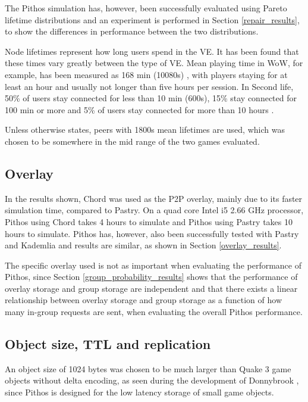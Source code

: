 The Pithos simulation has, however, been successfully evaluated using Pareto lifetime distributions and an experiment is performed in Section \ref{repair_results}, to show the differences in performance between the two distributions.

Node lifetimes represent how long users spend in the VE. It has been found that these times vary greatly between the type of VE. Mean playing time in WoW, for example, has been measured as 168 min (10080s) \cite{wow_gameplay_hours}, with players staying for at least an hour and usually not longer than five hours per session. In Second life, 50\% of users stay connected for less than 10 min (600s), 15\% stay connected for 100 min or more and 5\% of users stay connected for more than 10 hours \cite{Varvello_life_in_second_life}.

Unless otherwise states, peers with 1800s mean lifetimes are used, which was chosen to be somewhere in the mid range of the two games evaluated.

\subsection{Overlay}
In the results shown, Chord was used as the P2P overlay, mainly due to its faster simulation time, compared to Pastry. On a quad core Intel i5 2.66 GHz processor, Pithos using Chord takes 4 hours to simulate and Pithos using Pastry takes 10 hours to simulate. Pithos has, however, also been successfully tested with Pastry and Kademlia and results are similar, as shown in Section \ref{overlay_results}.

The specific overlay used is not as important when evaluating the performance of Pithos, since Section \ref{group_probability_results} shows that the performance of overlay storage and group storage are independent and that there exists a linear relationship between overlay storage and group storage as a function of how many in-group requests are sent, when evaluating the overall Pithos performance.

\subsection{Object size, TTL and replication}
An object size of 1024 bytes was chosen to be much larger than Quake 3 game objects without delta encoding, as seen during the development of Donnybrook \cite{Bharambe_Donnybrook}, since Pithos is designed for the low latency storage of small game objects.

